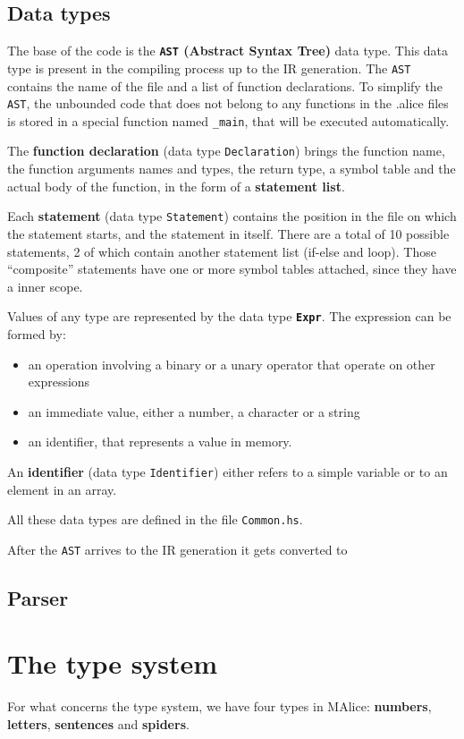 \documentclass{article}
\begin{document}
\subsection{Data types}
The base of the code is the \textbf{\texttt{AST} (Abstract Syntax
  Tree)} data type. This data type is present in the compiling process
up to the IR generation. The \texttt{AST} contains the name of the
file and a list of function declarations. To simplify the
\texttt{AST}, the unbounded code that does not belong to any functions
in the .alice files is stored in a special function named
\texttt{\_main}, that will be executed automatically.

The \textbf{function declaration} (data type \texttt{Declaration})
brings the function name, the function arguments names and types, the
return type, a symbol table and the actual body of the function, in
the form of a \textbf{statement list}.

Each \textbf{statement} (data type \texttt{Statement}) contains the
position in the file on which the statement starts, and the statement
in itself. There are a total of 10 possible statements, 2 of which
contain another statement list (if-else and loop). Those ``composite''
statements have one or more symbol tables attached, since they have a
inner scope.

Values of any type are represented by the data type
\textbf{\texttt{Expr}}. The expression can be formed by:
\begin{itemize}
\item an operation involving a binary or a unary operator that operate on other expressions
\item an immediate value, either a number, a character or a string
\item an identifier, that represents a value in memory.
\end{itemize}
An \textbf{identifier} (data type \texttt{Identifier}) either refers
to a simple variable or to an element in an array.

All these data types are defined in the file \texttt{Common.hs}.

After the \texttt{AST} arrives to the IR generation it gets converted
to 

\subsection{Parser}


\section{The type system}
For what concerns the type system, we have four types in MAlice:
\textbf{numbers}, \textbf{letters}, \textbf{sentences} and
\textbf{spiders}.
\end{document}

